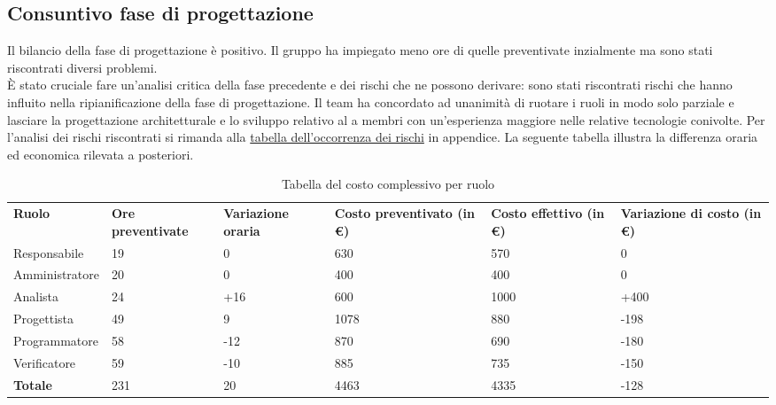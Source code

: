 \subsection{Consuntivo fase di progettazione}
Il bilancio della fase di progettazione è positivo. Il gruppo ha impiegato meno ore di quelle preventivate inzialmente ma sono stati riscontrati diversi problemi.\\
È stato cruciale fare un'analisi critica della fase precedente e dei rischi che ne possono derivare: sono stati riscontrati rischi che hanno influito nella ripianificazione della fase di progettazione.
Il team ha concordato ad unanimità di ruotare i ruoli in modo solo parziale e lasciare la progettazione architetturale e lo sviluppo relativo al  a membri con un'esperienza maggiore nelle relative tecnologie conivolte.
Per l'analisi dei rischi riscontrati si rimanda alla \hyperlink{Tabellaoccorrenzarischi}{tabella dell'occorrenza dei rischi} in appendice.
La seguente tabella illustra la differenza oraria ed economica rilevata a posteriori.
{
\renewcommand{\arraystretch}{2}
\begin{longtable}[h]{ C{2.5cm} C{2cm} C{1.8cm} C{2.2cm} C{1.5cm} C{2.3cm}}
\caption{Tabella del costo complessivo per ruolo}\\
\rowcolor{\primaryColor}

\textcolor{\secondaryColor}{\textbf{Ruolo}} & 
\textcolor{\secondaryColor}{\textbf{Ore preventivate}} & 
\textcolor{\secondaryColor}{\textbf{Variazione oraria}} & 
\textcolor{\secondaryColor}{\textbf{Costo preventivato (in \euro{})}} & 
\textcolor{\secondaryColor}{\textbf{Costo effettivo (in \euro{})}} & 
\textcolor{\secondaryColor}{\textbf{Variazione di costo (in \euro{})}}\\	
	
Responsabile    &  19 & 0 & 630 & 570 &  0 \\
Amministratore  &  20 & 0 & 400 & 400 & 0 \\
Analista        & 24 & +16 & 600 & 1000 & +400 \\
Progettista     &  49 & 9 & 1078 & 880 & -198 \\
Programmatore   &   58 & -12 & 870 &  690 & -180 \\
Verificatore    &  59 &  -10 & 885 & 735 & -150 \\
\textbf{Totale} & 231 & 20 & 4463 & 4335 & -128 \\	
\end{longtable}
}


